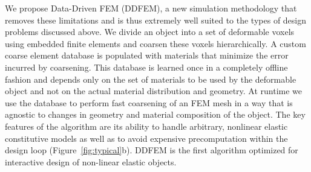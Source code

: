 We propose Data-Driven FEM (DDFEM), a new simulation methodology
that removes these limitations and is thus extremely well suited
to the types of design problems discussed above.
We divide an object into a set of deformable voxels using embedded finite
elements and coarsen these voxels hierarchically.
A custom coarse element database is populated with materials that minimize the error incurred by coarsening.
This database is learned once in a completely offline fashion and depends only on the set of materials to be used by the deformable object and not on the actual material distribution
and geometry.
At runtime we use the database to perform fast coarsening of an FEM mesh in a way that is agnostic to changes in geometry and material composition of the object.
The key features of the algorithm are its ability to handle arbitrary, nonlinear elastic
constitutive models as well as to avoid expensive precomputation
within the design loop (Figure~\ref{fig:typical}b).
DDFEM is the first algorithm optimized for interactive design of non-linear elastic objects.
